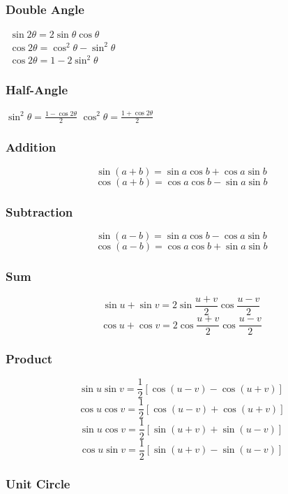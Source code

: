 \documentclass[10pt,letterpaper]{article}
\begin{document}
\begin{multicols}{2}
															\subsubsection*{Double Angle}

\begin{center} $ \begin{array}{l}
				  \sin 2\theta = 2\sin\theta\cos\theta \\
				  \cos 2\theta = \cos ^{2} \theta - \sin ^{2} \theta \\
				  \cos 2\theta = 1 - 2\sin ^{2}\theta
				 \end{array} $ \end{center}

															\subsubsection*{Half-Angle}

$ \sin ^{2} \theta = \frac{1 - \cos 2 \theta}{2} $ \hfill
$ \cos ^{2} \theta = \frac{1+\cos 2\theta}{2} $

															\subsubsection*{Addition}

\[ \sin ( a + b ) = \sin a\cos b + \cos a\sin b \]
\[ \cos ( a + b ) = \cos a\cos b - \sin a\sin b \]

															\subsubsection*{Subtraction}

\[ \sin ( a - b ) = \sin a\cos b - \cos a\sin b \]
\[ \cos ( a - b ) = \cos a\cos b + \sin a\sin b \]

															\subsubsection*{Sum}

\[ \sin u + \sin v = 2\sin \frac{u+v}{2}\cos \frac{u-v}{2} \]
\[ \cos u + \cos v = 2\cos \frac{u+v}{2}\cos \frac{u-v}{2} \]

															\subsubsection*{Product}

\[ \sin u\sin v = \frac{1}{2}\left[ \cos(u-v)-\cos(u+v) \right] \]
\[ \cos u\cos v = \frac{1}{2}\left[ \cos(u-v)+\cos(u+v) \right] \]
\[ \sin u\cos v = \frac{1}{2}\left[ \sin(u+v)+\sin(u-v) \right] \]
\[ \cos u\sin v = \frac{1}{2}\left[ \sin(u+v)-\sin(u-v) \right] \]

\end{multicols}												\subsubsection*{Unit Circle}
\end{document}

